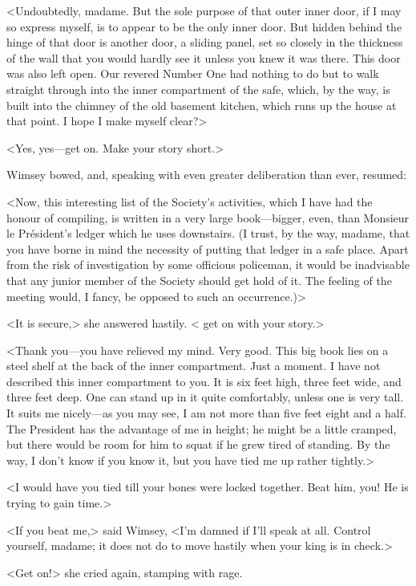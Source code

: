 <Undoubtedly, madame. But the sole purpose of that outer inner door, if I may so express myself, is to appear to be the only inner door. But hidden behind the hinge of that door is another door, a sliding panel, set so closely in the thickness of the wall that you would hardly see it unless you knew it was there. This door was also left open. Our revered Number One had nothing to do but to walk straight through into the inner compartment of the safe, which, by the way, is built into the chimney of the old basement kitchen, which runs up the house at that point. I hope I make myself clear?>

<Yes, yes—get on. Make your story short.>

Wimsey bowed, and, speaking with even greater deliberation than ever, resumed:

<Now, this interesting list of the Society's activities, which I have had the honour of compiling, is written in a very large book—bigger, even, than Monsieur le Président's ledger which he uses downstairs. (I trust, by the way, madame, that you have borne in mind the necessity of putting that ledger in a safe place. Apart from the risk of investigation by some officious policeman, it would be inadvisable that any junior member of the Society should get hold of it. The feeling of the meeting would, I fancy, be opposed to such an occurrence.)>

<It is secure,> she answered hastily. < get on with your story.>

<Thank you—you have relieved my mind. Very good. This big book lies on a steel shelf at the back of the inner compartment. Just a moment. I have not described this inner compartment to you. It is six feet high, three feet wide, and three feet deep. One can stand up in it quite comfortably, unless one is very tall. It suits me nicely—as you may see, I am not more than five feet eight and a half. The President has the advantage of me in height; he might be a little cramped, but there would be room for him to squat if he grew tired of standing. By the way, I don't know if you know it, but you have tied me up rather tightly.>

<I would have you tied till your bones were locked together. Beat him, you! He is trying to gain time.>

<If you beat me,> said Wimsey, <I'm damned if I'll speak at all. Control yourself, madame; it does not do to move hastily when your king is in check.>

<Get on!> she cried again, stamping with rage.

